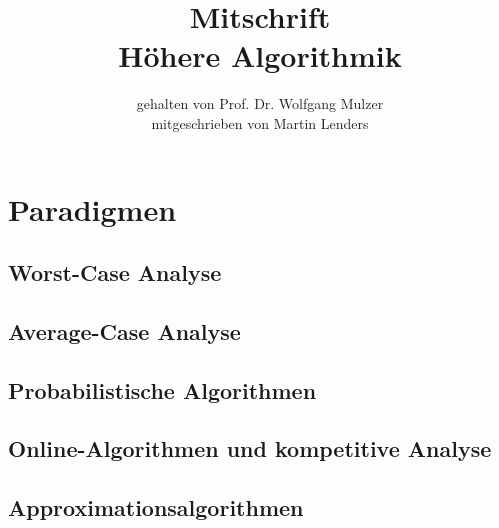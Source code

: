 \documentclass[a4paper,10pt]{scrbook}
\title{Mitschrift\\{\LARGE Höhere Algorithmik}}
\author{gehalten von Prof. Dr. Wolfgang Mulzer \\ mitgeschrieben von Martin Lenders}
\begin{document}
\maketitle
\tableofcontents





























\chapter{Paradigmen}
\section{Worst-Case Analyse}
\section{Average-Case Analyse}
\section{Probabilistische Algorithmen}
\section{Online-Algorithmen und kompetitive Analyse}
\section{Approximationsalgorithmen}
\end{document}
